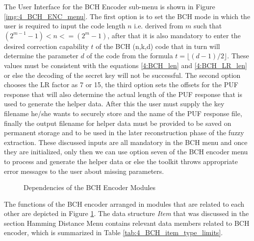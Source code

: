 	The User Interface for the BCH Encoder sub-menu is shown in Figure \ref{img:4_BCH_ENC_menu}. The first option is to set the BCH mode in which the user is required to input the code length $n$ i.e. derived from $m$ such that $(2^{m-1} - 1) < n <= (2^m - 1)$, after that it is also mandatory to enter the desired correction capability $t$ of the BCH (n,k,d) code that in turn will determine the parameter $d$ of the code from the formula $t = \lfloor(d-1)/2\rfloor$.
	These values must be consistent with the equations \ref{4:BCH_len} and \ref{4:BCH_LR_len} or else the decoding of the secret key will not be successful. The second option chooses the LR factor as 7 or 15, the third option sets the offsets for the PUF response that will also determine the actual length of the PUF response that is used to generate the helper data. After this the user must supply the key filename he/she wants to securely store and the name of the PUF
	response file, finally the output filename for helper data must be provided to be saved on permanent storage and to be used in the later reconstruction phase of the fuzzy extraction. These discussed inputs are all mandatory in the BCH menu and once they are initialized, only then we can use option seven of the BCH encoder menu to process and generate the helper data or else the toolkit throws appropriate error messages to the user about missing parameters.\\

	\begin{figure}[h!]
	\centering
	\caption{Dependencies of the BCH Encoder Modules}
	\label{img:bchenc_fns}
	\end{figure}

	The functions of the BCH encoder arranged in modules that are related to each other are depicted in Figure \ref{img:bchenc_fns}.
	The data structure \emph{Item} that was discussed in the section Hamming Distance Menu contains relevant data members related to BCH encoder, which is summarized in Table \ref{tab:4_BCH_item_type_limits}.


